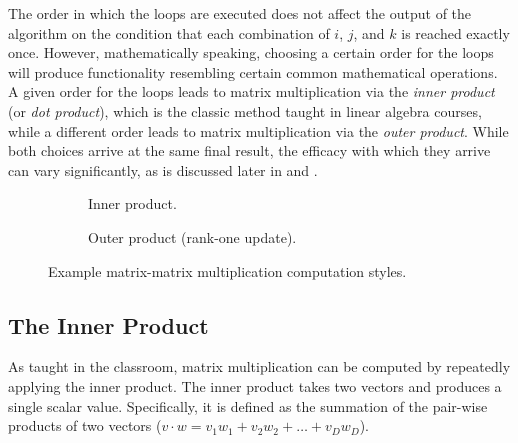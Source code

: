 \documentclass[\main/thesis.tex]{subfiles}
\begin{document}
The order in which the loops are executed does not affect the output of the algorithm on the condition that each combination of $i$, $j$, and $k$ is reached exactly once.
However, mathematically speaking, choosing a certain order for the loops will produce functionality resembling certain common mathematical operations.
A given order for the loops leads to matrix multiplication via the \emph{inner product} (or \emph{dot product}), which is the classic method taught in linear algebra courses, while a different order leads to matrix multiplication via the \emph{outer product}.
While both choices arrive at the same final result, the efficacy with which they arrive can vary significantly, as is discussed later in  and .

\begin{figure}[t]
 \hfill
  \begin{subfigure}{.45\linewidth}
    \centering
    \caption{Inner product.}
    \label{fig:innerProduct}
  \end{subfigure}
 \hfill
  \begin{subfigure}{.45\linewidth}
    \centering
  \caption{Outer product (rank-one update).}
    \label{fig:outerProduct}
  \end{subfigure}
  \hfill
  \caption{Example matrix-matrix multiplication computation styles.}
  \label{fig:product}
  \vspace{-0.15cm}
\end{figure}

\subsection{The Inner Product}
As taught in the classroom, matrix multiplication can be computed by repeatedly applying the inner product.
The inner product takes two vectors and produces a single scalar value.
Specifically, it is defined as the summation of the pair-wise products of two vectors (\eg $v \cdot w=v_{1}w_{1} + v_{2}w_{2} + \ldots + v_{D}w_{D}$).
\end{document}
